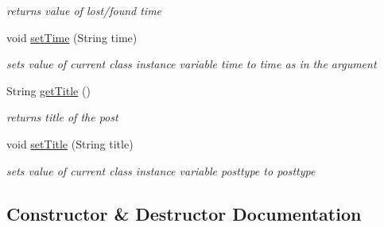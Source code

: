 \begin{DoxyCompactItemize}
\begin{DoxyCompactList}\small\item\em returns value of lost/found time \end{DoxyCompactList}\item 
void \hyperlink{classcom_1_1example_1_1sel_1_1lostfound_1_1Posts_aee3490b623adb317e20452d1d7ea6f2f}{set\+Time} (String time)
\begin{DoxyCompactList}\small\item\em sets value of current class instance variable time to time as in the argument \end{DoxyCompactList}\item 
String \hyperlink{classcom_1_1example_1_1sel_1_1lostfound_1_1Posts_afc8f8e5a89b3da692a896055102c45c4}{get\+Title} ()\hypertarget{classcom_1_1example_1_1sel_1_1lostfound_1_1Posts_afc8f8e5a89b3da692a896055102c45c4}{}\label{classcom_1_1example_1_1sel_1_1lostfound_1_1Posts_afc8f8e5a89b3da692a896055102c45c4}

\begin{DoxyCompactList}\small\item\em returns title of the post \end{DoxyCompactList}\item 
void \hyperlink{classcom_1_1example_1_1sel_1_1lostfound_1_1Posts_a10d0df682b6a9f765606151a2a94047e}{set\+Title} (String title)
\begin{DoxyCompactList}\small\item\em sets value of current class instance variable posttype to posttype \end{DoxyCompactList}\end{DoxyCompactItemize}


\subsection{Constructor \& Destructor Documentation}
